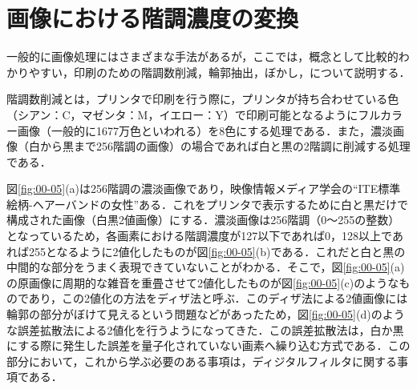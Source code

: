 \section{画像における階調濃度の変換}

一般的に画像処理にはさまざまな手法があるが，ここでは，概念として比較的わかりやすい，印刷のための階調数削減，輪郭抽出，ぼかし，について説明する．

階調数削減とは，プリンタで印刷を行う際に，プリンタが持ち合わせている色（シアン：C，マゼンタ：M，イエロー：Y）で印刷可能となるようにフルカラー画像（一般的に1677万色といわれる）を8色にする処理である．また，濃淡画像（白から黒まで256階調の画像）の場合であれば白と黒の2階調に削減する処理である．

図\ref{fig:00-05}(a)は256階調の濃淡画像であり，映像情報メディア学会の``ITE標準絵柄-ヘアーバンドの女性''ある．これをプリンタで表示するために白と黒だけで構成された画像（白黒2値画像）にする．濃淡画像は256階調（0～255の整数）となっているため，各画素における階調濃度が127以下であれば0，128以上であれば255となるように2値化したものが図\ref{fig:00-05}(b)である．これだと白と黒の中間的な部分をうまく表現できていないことがわかる．そこで，図\ref{fig:00-05}(a)の原画像に周期的な雑音を重畳させて2値化したものが図\ref{fig:00-05}(c)のようなものであり，この2値化の方法をディザ法と呼ぶ．このディザ法による2値画像には輪郭の部分がぼけて見えるという問題などがあったため，図\ref{fig:00-05}(d)のような誤差拡散法による2値化を行うようになってきた．この誤差拡散法は，白か黒にする際に発生した誤差を量子化されていない画素へ繰り込む方式である．この部分において，これから学ぶ必要のある事項は，ディジタルフィルタに関する事項である．

